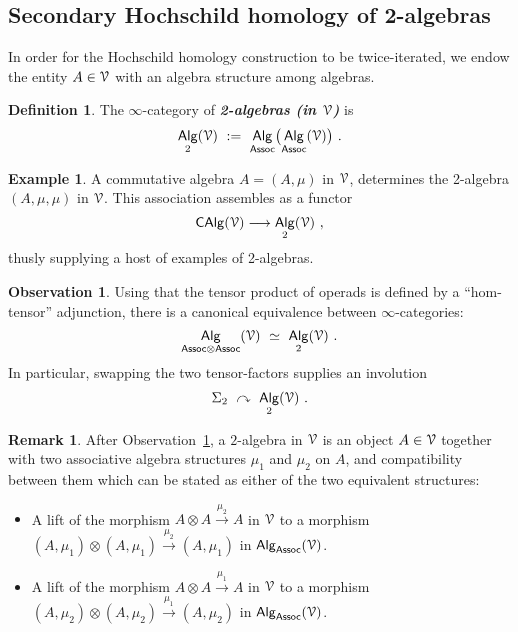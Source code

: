 \documentclass{amsart}
\theoremstyle{definition}
\newtheorem{definition}[theorem]{Definition}
\newtheorem{observation}[theorem]{Observation}
\newtheorem{remark}[theorem]{Remark}
\newtheorem{example}[theorem]{Example}
\theoremstyle{remark}
\DeclareMathOperator{\Alg}{\sf Alg}
\DeclareMathOperator{\CAlg}{\sf CAlg}
\newcommand{\bit}[1]{\textbf{\textit{#1}}}
\newcommand{\lacts}{\curvearrowright}
\def\ot{\otimes}
\newcommand{\xra}{\xrightarrow}
\begin{document}
\subsection{Secondary Hochschild homology of 2-algebras}

In order for the Hochschild homology construction to be twice-iterated, we endow the entity $A\in \mathcal V$ with an algebra structure among algebras.
\begin{definition}
\label{d4}
The $\infty$-category of \bit{2-algebras (in $\mathcal V$)} is
\[
\Alg_2(\cV)
~:=~
\Alg_{\sf Assoc}\bigl(
\Alg_{\sf Assoc}(\cV)
\bigr)
~.
\]

\end{definition}


\begin{example}
A commutative algebra $A = (A,\mu)$ in $\mathcal V$, 
determines the 2-algebra $(A,\mu,\mu)$ in $\mathcal V$.
This association assembles as a functor
\[
\CAlg(\cV)
\longrightarrow
\Alg_2(\cV)
~,
\]
thusly supplying a host of examples of 2-algebras.

\end{example}



\begin{observation}
\label{t46}
Using that the tensor product of operads is defined by a ``hom-tensor'' adjunction, there is a canonical equivalence between $\infty$-categories:
\[
\Alg_{{\sf Assoc}\ot {\sf Assoc}}(\cV)
~\simeq~
\Alg_2(\cV)
~.
\]
In particular, swapping the two tensor-factors supplies an involution 
\[
\Sigma_2
~\lacts~ 
\Alg_2(\cV)
~.
\]

\end{observation}

\begin{remark}
\label{r12}
After Observation~\ref{t46}, a $2$-algebra in $\mathcal V$ is an object $A\in \mathcal V$ together with two associative algebra structures $\mu_1$ and $\mu_2$ on $A$, and compatibility between them which can be stated as either of the two equivalent structures:
\begin{itemize} 

\item
A lift of the morphism $A\ot A \xra{\mu_2} A$ in $\mathcal V$ to a morphism $(A,\mu_1)\otimes (A,\mu_1) \xra{\mu_2} (A,\mu_1)$ in $\Alg_{\sf Assoc}(\cV)$.

\item
A lift of the morphism $A\ot A \xra{\mu_1} A$ in $\mathcal V$ to a morphism $(A,\mu_2)\otimes (A,\mu_2) \xra{\mu_1} (A,\mu_2)$ in $\Alg_{\sf Assoc}(\cV)$.

\end{itemize}

\end{remark}
\end{document}

